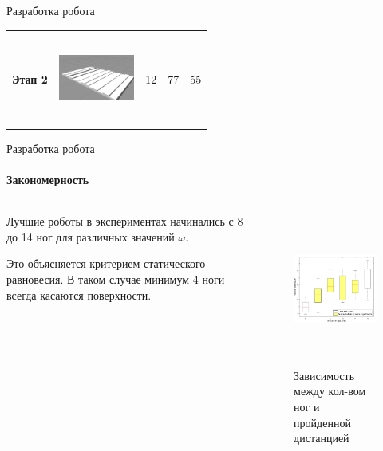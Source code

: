 \documentclass[aspectratio=169,xcolor=table]{beamer}
\begin{document}
\begin{frame}[t]{Разработка робота}
\begin{table}[H]
\begin{tabular}{c|c|c|c|c}
            \multirow{-3}{*}{\textbf{Этап 2}} & \begin{minipage}{2.5cm}\includegraphics[height=3cm,width=2.5cm,keepaspectratio]{terrain_3.jpg}\end{minipage}                   & \cellcolor[HTML]{DAE8FC}12 & 77                                                                             & \multirow{-3}{*}{55}
        \end{tabular}
    \end{table}

\end{frame}

\begin{frame}[t]{Разработка робота}
    \framesubtitle{Закономерность}
    \begin{columns}[T,onlytextwidth]
        \begin{column}{0.49\textwidth}
            Лучшие роботы в экспериментах начинались с 8 до 14 ног для различных значений $\omega$.

            Это объясняется критерием статического равновесия. В таком случае минимум 4 ноги всегда касаются поверхности.
        \end{column}
        \begin{column}{0.49\textwidth}
            \vspace{-1.8cm}
            \begin{figure}[H]
                \centering\includegraphics[height=5cm,width=1\textwidth,keepaspectratio]{box_plot_structural_synthesis.png}
                \caption*{Зависимость между кол-вом ног и пройденной дистанцией}
                \label{fig:box_plot_structural_synthesis.png}
            \end{figure}
        \end{column}
    \end{columns}
\end{frame}
\end{document}
